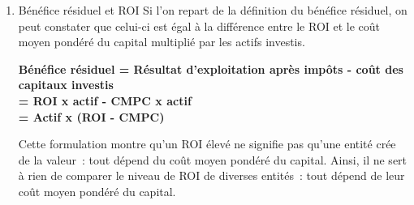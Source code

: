 \documentclass{tufte-handout}
\begin{document}
\begin{enumerate}
\item Bénéfice résiduel et ROI
\label{sec:orgc24fef0}
Si l'on repart de la définition du bénéfice résiduel, on peut constater que celui-ci est égal à la différence entre le ROI et le coût moyen pondéré du capital multiplié par les actifs investis.\\
\begin{center}
\textbf{Bénéfice résiduel = Résultat d'exploitation après impôts - coût des\\
capitaux investis}\\
\textbf{= ROI x actif - CMPC x actif}\\
\textbf{= Actif x (ROI - CMPC)}\\
\end{center}
Cette formulation montre qu'un ROI élevé ne signifie pas qu'une entité crée de la valeur : tout dépend du coût moyen pondéré du capital. Ainsi, il ne sert à rien de comparer le niveau de ROI de diverses entités : tout dépend de leur coût moyen pondéré du capital.\\


\end{enumerate}
\end{document}
